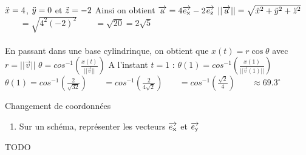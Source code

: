 \documentclass[11pt]{article}
\begin{document}
\begin{application}{}{}
    $\Ddot{x} = 4$, $\Ddot{y} = 0$ et $\Ddot{z} = -2$\n
    Ainsi on obtient $\Vec{a} = 4 \base{x} -2 \base{z}$\n
    $||\Vec{a}|| = \sqrt{\Ddot{x}^{2} + \Ddot{y}^{2} + \Ddot{z}^{2}}$\n
    $~~~~~~~~ = \sqrt{4^{2} (-2)^{2}}$\n
    $~~~~~~~~ = \sqrt{20} = 2\sqrt{5}$\\\\
     En passant dans une base cylindrinque, on obtient que $x(t) = r\cos{\theta}$ avec $r = ||\Vec{v}||$\n
    $\theta = cos^{-1}(\frac{x(t)}{||\Vec{v}||})$\n
    A l'instant $t = 1$ : $\theta(1) = cos^{-1}(\frac{x(1)}{||\Vec{v}(1)||})$\n
    $\theta(1) = cos^{-1}(\frac{2}{\sqrt{32}})$\n
    $~~~~~~~ = cos^{-1}(\frac{2}{4\sqrt{2}})$\n
    $~~~~~~~ = cos^{-1}(\frac{\sqrt{2}}{4})$\n
    $~~~~~~~ \approx 69.3^{\circ}$\n
\end{application}

\begin{application}{Changement de coordonnées}{}
    \begin{enumerate}
        \item Sur un schéma, représenter les vecteurs $\base{x}$ et $\base{y}$
    \end{enumerate}
    \tcblower\n
     TODO 
\end{application}
\end{document}
